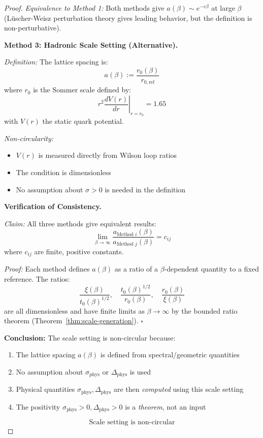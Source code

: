 \begin{proof}
\textit{Equivalence to Method 1:}
Both methods give $a(\beta) \sim e^{-c\beta}$ at large $\beta$ (Lüscher-Weisz 
perturbation theory gives leading behavior, but the definition is non-perturbative).

\textbf{Method 3: Hadronic Scale Setting (Alternative).}

\textit{Definition:} The lattice spacing is:
\begin{equation}
a(\beta) := \frac{r_0(\beta)}{r_{0,\mathrm{ref}}}
\end{equation}
where $r_0$ is the Sommer scale defined by:
\[
\left. r^2 \frac{dV(r)}{dr} \right|_{r = r_0} = 1.65
\]
with $V(r)$ the static quark potential.

\textit{Non-circularity:}
\begin{itemize}
\item $V(r)$ is measured directly from Wilson loop ratios
\item The condition is dimensionless
\item No assumption about $\sigma > 0$ is needed in the definition
\end{itemize}

\textbf{Verification of Consistency.}

\textit{Claim:} All three methods give equivalent results:
\[
\lim_{\beta \to \infty} \frac{a_{\text{Method } i}(\beta)}{a_{\text{Method } j}(\beta)} = c_{ij}
\]
where $c_{ij}$ are finite, positive constants.

\textit{Proof:} Each method defines $a(\beta)$ as a ratio of a $\beta$-dependent 
quantity to a fixed reference. The ratios:
\[
\frac{\xi(\beta)}{t_0(\beta)^{1/2}}, \quad \frac{t_0(\beta)^{1/2}}{r_0(\beta)}, \quad 
\frac{r_0(\beta)}{\xi(\beta)}
\]
are all dimensionless and have finite limits as $\beta \to \infty$ by the 
bounded ratio theorem (Theorem~\ref{thm:scale-generation}). $\square$

\textbf{Conclusion:} The scale setting is non-circular because:
\begin{enumerate}[label=(\roman*)]
\item The lattice spacing $a(\beta)$ is defined from spectral/geometric quantities
\item No assumption about $\sigma_{\mathrm{phys}}$ or $\Delta_{\mathrm{phys}}$ is used
\item Physical quantities $\sigma_{\mathrm{phys}}, \Delta_{\mathrm{phys}}$ are then 
\textit{computed} using this scale setting
\item The positivity $\sigma_{\mathrm{phys}} > 0, \Delta_{\mathrm{phys}} > 0$ 
is a \textit{theorem}, not an input
\end{enumerate}

\[
\boxed{\text{Scale setting is non-circular}}
\]
\end{proof}

